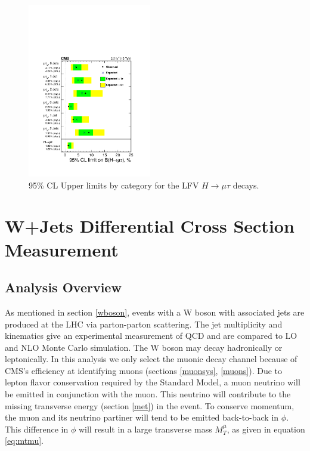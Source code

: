 \documentclass[oneside, letterpaper, oldfontcommands]{memoir}
\begin{document}
\begin{figure}[hbtp]\centering
\includegraphics[width=0.48\textwidth]{13TeVLimits.pdf}
 \caption{95\% CL Upper limits by category for the LFV $H \rightarrow \mu \tau$  decays.}
 \label{fig:limits_summary13TeV}\end{figure}



\chapter{W+Jets Differential Cross Section Measurement}\label{wjets}

\section{Analysis Overview}

\qquad As mentioned in section \ref{wboson}, events with a W boson with associated jets are produced at the LHC via parton-parton scattering. The jet multiplicity and kinematics give an experimental measurement of QCD and are compared to LO and NLO Monte Carlo simulation. The W boson may decay hadronically or leptonically. In this analysis we only select the muonic decay channel because of CMS's efficiency at identifying muons (sections \ref{muonsys}, \ref{muons}). Due to lepton flavor conservation required by the Standard Model, a muon neutrino will be emitted in conjunction with the muon. This neutrino will contribute to the missing transverse energy (section \ref{met}) in the event. To conserve momentum, the muon and its neutrino partiner will tend to be emitted back-to-back in $\phi$. This difference in $\phi$ will result in a large transverse mass $M_{T}^{\mu}$, as given in equation \ref{eq:mtmu}. 
\end{document}

